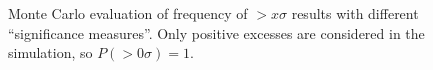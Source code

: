 \begin{figure}[ht]
\centerline{}
\caption{\label{FIG::APPLIANDMA::SIGMA} Monte Carlo evaluation of 
frequency of $>x\sigma$ results with different ``significance
measures''. Only positive excesses are considered in the simulation,
so $P(>0\sigma)=1$.}
\end{figure}
